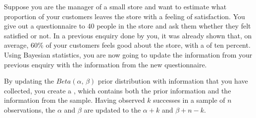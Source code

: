 \setcounter{chapter}{8}
\setcounter{section}{2}
\setcounter{question}{0}



Suppose you are the manager of a small store and want to estimate what proportion of your customers leaves the store with a feeling of satisfaction. You give out a questionnaire to 40 people in the store and ask them whether they felt satisfied or not. In a previous enquiry done by you, it was already shown that, on average, 60\% of your customers feels good about the store, with a  of ten percent. Using Bayesian statistics, you are now going to update the information from your previous enquiry with the information from the new questionnaire. \\



\onelineanswerbox


\emptyanswerbox{
    $\alpha$: \shortanswerline \hspace*{3cm} $\beta$: \shortanswerline
}


\rcodeanswertiny

By updating the $Beta(\alpha,\, \beta)$ prior distribution with information that you have collected, you create a , which contains both the prior information and the information from the sample. Having observed $k$ successes in a sample of $n$ observations, the  $\alpha$ and $\beta$ are updated to the  $\alpha + k$ and $\beta + n - k$. \\

